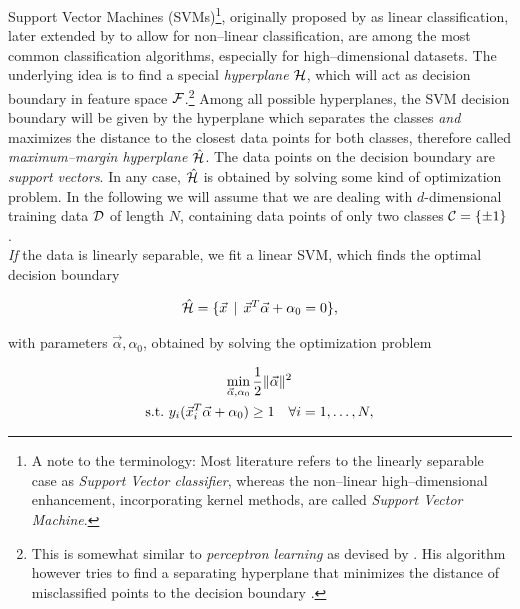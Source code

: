 Support Vector Machines (SVMs)\footnote{A note to the terminology: Most literature refers to the linearly separable case as \emph{Support Vector classifier}, whereas the non--linear high--dimensional enhancement, incorporating kernel methods, are called \emph{Support Vector Machine}.}, originally proposed by \citet{vapnik1963} as linear classification, later extended by \citet{cortes1995} to allow for non--linear classification, are among the most common classification algorithms, especially for high--dimensional datasets. The underlying idea is to find a special \emph{hyperplane} $\mathcal{H}$, which will act as decision boundary in feature space $\mathcal{F}$.\footnote{This is somewhat similar to \emph{perceptron learning} as devised by \citet{rosenblatt1958}. His algorithm however tries to find a separating hyperplane that minimizes the distance of misclassified points to the decision boundary \citep{hastie2001}.} Among all possible hyperplanes, the SVM decision boundary will be given by the hyperplane which separates the classes \emph{and} maximizes the distance to the closest data points for both classes, therefore called \emph{maximum--margin hyperplane} $\hat {\mathcal{H}}$. The data points on the decision boundary are \emph{support vectors}. In any case, $\hat {\mathcal{H}}$ is obtained by solving some kind of optimization problem. In the following we will assume that we are dealing with $d$-dimensional training data $\mathcal{D}$ of length $N$, containing data points of only two classes $\mathcal{C} = \{ \pm 1 \}$. \\



\emph{If} the data is linearly separable, we fit a linear SVM, which finds the optimal decision boundary

\begin{equation}
\hat {\mathcal{H}} = \{ \vec x \, \mid \, \vec x^T \vec \alpha + \alpha_0 = 0 \},
\end{equation}

with parameters $\vec \alpha, \alpha_0$, obtained by solving the optimization problem

\begin{gather}
\label{eq:svm-linear-hyperplane}
\min_{\vec \alpha, \alpha_0} \frac{1}{2} \| \vec \alpha \|^2 \\
\text{\st} y_i (\vec x_i^T \vec \alpha + \alpha_0) \ge 1 \quad \forall i = 1, \ldots, N,
\end{gather}

